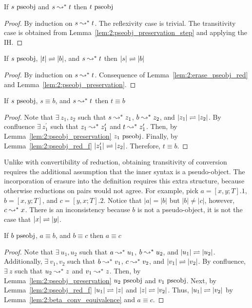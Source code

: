 \begin{lemma}
    \label{lem:2:pseobj_preservation}
    If $s~\textnormal{pseobj}$ and $s \leadsto^* t$ then $t~\textnormal{pseobj}$
\end{lemma}
\begin{proof}
    By induction on $s \leadsto^* t$.
    The reflexivity case is trivial.
    The transitivity case is obtained from Lemma~\ref{lem:2:pseobj_preservation_step} and applying the IH.
\end{proof}

\begin{lemma}
    \label{lem:2:pseobj_red_b}
    If $s~\textnormal{pseobj}$, $|t| \rightleftharpoons |b|$, and $s \leadsto^* t$ then $|s| \rightleftharpoons |b|$
\end{lemma}
\begin{proof}
    By induction on $s \leadsto^* t$.
    Consequence of Lemma~\ref{lem:2:erase_pseobj_red} and Lemma~\ref{lem:2:pseobj_preservation}.
\end{proof}

\begin{lemma}
    \label{lem:2:conv_red_f}
    If $s~\textnormal{pseobj}$, $s \equiv b$, and $s \leadsto^* t$ then $t \equiv b$
\end{lemma}
\begin{proof}
    Note that $\exists\ z_1, z_2$ such that $s \leadsto^* z_1$, $b \leadsto^* z_2$, and $|z_1| \rightleftharpoons |z_2|$.
    By confluence $\exists\ z_1^\prime$ such that $z_1 \leadsto^* z_1^\prime$ and $t \leadsto^* z_1^\prime$.
    Then, by Lemma~\ref{lem:2:pseobj_preservation} $z_1~\textnormal{pseobj}$.
    Finally, by Lemma~\ref{lem:2:pseobj_red_f} $|z_1^\prime| \rightleftharpoons |z_2|$.
    Therefore, $t \equiv b$.
\end{proof}

Unlike with convertibility of reduction, obtaining transitivity of conversion requires the additional assumption that the inner syntax is a pseudo-object.
The incorporation of erasure into the definition requires this extra structure, because otherwise reductions on pairs would not agree.
For example, pick $a = [x, y; T].1$, $b = [x, y; T]$, and $c = [y, x; T].2$.
Notice that $|a| = |b|$ but $|b| \neq |c|$, however, $c \leadsto^* x$.
There is an inconsistency because $b$ is not a pseudo-object, it is not the case that $|x| \rightleftharpoons |y|$.

\begin{lemma}
    If $b~\textnormal{pseobj}$, $a \equiv b$, and $b \equiv c$ then $a \equiv c$
    \label{thm:2:conv_trans}
\end{lemma}
\begin{proof}
    Note that $\exists\ u_1, u_2$ such that $a \leadsto^* u_1$, $b \leadsto^* u_2$, and $|u_1| \rightleftharpoons |u_2|$.
    Additionally, $\exists\ v_1, v_2$ such that $b \leadsto^* v_1$, $c \leadsto^* v_2$, and $|v_1| \rightleftharpoons |v_2|$.
    By confluence, $\exists\ z$ such that $u_2 \leadsto^* z$ and $v_1 \leadsto^* z$.
    Then, by Lemma~\ref{lem:2:pseobj_preservation} $u_2~\textnormal{pseobj}$ and $v_1~\textnormal{pseobj}$.
    Next, by Lemma~\ref{lem:2:pseobj_red_f} $|u_1| \rightleftharpoons |z|$ and $|z| \rightleftharpoons |v_2|$.
    Thus, $|u_1| \rightleftharpoons |v_2|$ by Lemma~\ref{lem:2:beta_conv_equivalence} and $a \equiv c$.
\end{proof}

